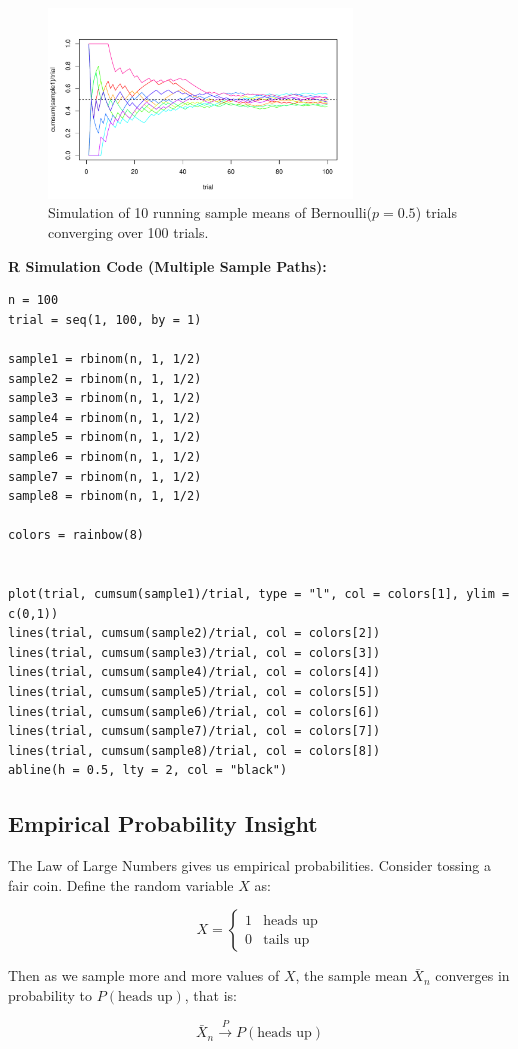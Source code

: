\begin{figure}[h!]
  \centering
  \includegraphics[width=0.72\textwidth]{Section5/images/simulation_multi.pdf}
  \caption{Simulation of 10 running sample means of Bernoulli(\(p = 0.5\)) trials converging over 100 trials.}
\end{figure}


\noindent\textbf{R Simulation Code (Multiple Sample Paths):}
\begin{tcolorbox}[
    colback=gray!10,
    colframe=black!45,
    arc=2mm,
    enhanced,
    breakable,
    width=1.05\textwidth,
    enlarge left by=-1.5em,
    boxsep=0pt,
    left=6pt,   %
    right=0pt,
    top=2pt,
    bottom=2pt
]
\begin{verbatim}
n = 100
trial = seq(1, 100, by = 1)

sample1 = rbinom(n, 1, 1/2)
sample2 = rbinom(n, 1, 1/2)
sample3 = rbinom(n, 1, 1/2)
sample4 = rbinom(n, 1, 1/2)
sample5 = rbinom(n, 1, 1/2)
sample6 = rbinom(n, 1, 1/2)
sample7 = rbinom(n, 1, 1/2)
sample8 = rbinom(n, 1, 1/2)

colors = rainbow(8)


plot(trial, cumsum(sample1)/trial, type = "l", col = colors[1], ylim = c(0,1))
lines(trial, cumsum(sample2)/trial, col = colors[2])
lines(trial, cumsum(sample3)/trial, col = colors[3])
lines(trial, cumsum(sample4)/trial, col = colors[4])
lines(trial, cumsum(sample5)/trial, col = colors[5])
lines(trial, cumsum(sample6)/trial, col = colors[6])
lines(trial, cumsum(sample7)/trial, col = colors[7])
lines(trial, cumsum(sample8)/trial, col = colors[8])
abline(h = 0.5, lty = 2, col = "black")
\end{verbatim}
\end{tcolorbox}

\subsection*{Empirical Probability Insight}


The Law of Large Numbers gives us empirical probabilities. Consider tossing a fair coin. Define the random variable \( X \) as:

\[
X = \begin{cases}
1 & \text{heads up} \\
0 & \text{tails up}
\end{cases}
\]

Then as we sample more and more values of \( X \), the sample mean \( \bar{X}_n \) converges in probability to \( P(\text{heads up}) \), that is:

\[
\bar{X}_n \xrightarrow{P} P(\text{heads up}) 
\]


